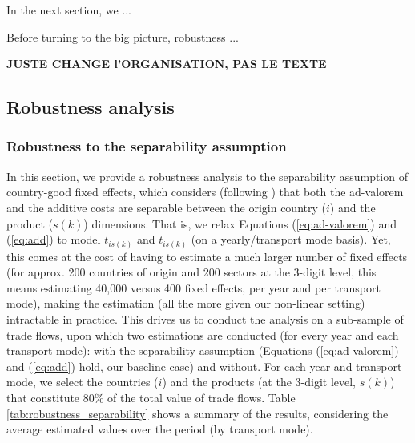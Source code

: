\documentclass[a4paper,11pt]{article}
\begin{document}
In the next section, we ... 

Before turning to the big picture, robustness ...

\textbf{JUSTE CHANGE l'ORGANISATION, PAS LE TEXTE}

\subsection{Robustness analysis \label{sec:robustness}}


\subsubsection{Robustness to the separability assumption}
In this section, we provide a robustness analysis to the separability assumption of country-good fixed effects, which considers (following \citealp{Irrazabal_2015}) that both the ad-valorem and the additive costs are separable between the origin country ($i$) and the product ($s(k)$) dimensions.
That is, we relax Equations (\ref{eq:ad-valorem}) and (\ref{eq:add}) to model $t_{is(k)}$ and $t_{is(k)}$ (on a yearly/transport mode basis).
Yet, this comes at the cost of having to estimate a much larger number of fixed effects (for approx. 200 countries of origin and 200 sectors at the 3-digit level, this means estimating 40,000 versus 400 fixed effects, per year and per transport mode), making the estimation (all the more given our non-linear setting) intractable in practice.
This drives us to conduct the analysis on a sub-sample of trade flows, upon which two estimations are conducted (for every year and each transport mode): with the separability assumption (Equations (\ref{eq:ad-valorem}) and (\ref{eq:add}) hold, our baseline case) and without.
For each year and transport mode, we select the countries ($i$) and the products (at the 3-digit level, $s(k)$) that constitute 80\% of the total value of trade flows. Table \ref{tab:robustness_separability} shows a summary of the results, considering the average estimated values over the period (by transport mode).
\end{document}
